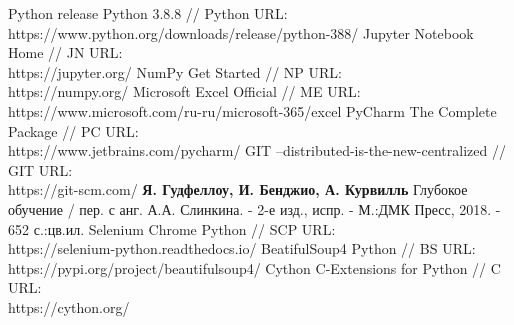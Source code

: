 \documentclass{article}
\begin{document}
	\newpage
	\begin{thebibliography}{}
		  Python release Python 3.8.8 // Python URL: \\ https://www.python.org/downloads/release/python-388/ 
		  Jupyter Notebook Home // JN URL: \\ https://jupyter.org/
		  NumPy Get Started // NP URL: \\ https://numpy.org/
		  Microsoft Excel Official // ME URL: \\ https://www.microsoft.com/ru-ru/microsoft-365/excel
		  PyCharm The Complete Package // PC URL: \\ https://www.jetbrains.com/pycharm/
			GIT --distributed-is-the-new-centralized // GIT URL: \\
		https://git-scm.com/
		  \textbf{Я. Гудфеллоу, И. Бенджио, А. Курвилль} Глубокое обучение / пер. с анг. А.А. Слинкина. - 2-е изд., испр. - М.:ДМК Пресс, 2018. - 652 с.:цв.ил. 
		  Selenium Chrome Python // SCP URL: \\
		https://selenium-python.readthedocs.io/
		  BeatifulSoup4 Python // BS URL: \\
		https://pypi.org/project/beautifulsoup4/
		 Cython C-Extensions for Python // C URL: \\
		https://cython.org/
	\end{thebibliography}
\end{document}
